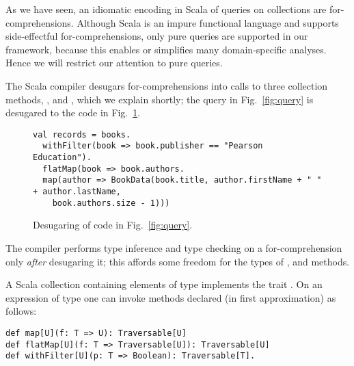 

As we have seen, an idiomatic encoding in Scala of queries on collections are for-comprehensions. Although Scala is an impure functional language and supports side-effectful for-comprehensions, only pure queries are supported in our framework, because this enables or simplifies many domain-specific analyses. Hence we will restrict our attention to pure queries.

The Scala compiler desugars for-comprehensions into calls to three collection methods, ,  and , which we explain shortly; the query in Fig.~\ref{fig:query} is desugared to the code in Fig.~\ref{fig:desugaredQuery}.
\begin{figure}
\begin{center}
\begin{lstlisting}
val records = books.
  withFilter(book => book.publisher == "Pearson Education").
  flatMap(book => book.authors.
  map(author => BookData(book.title, author.firstName + " " + author.lastName,
    book.authors.size - 1)))
\end{lstlisting}
\end{center}
\caption{Desugaring of code in Fig.~\ref{fig:query}.}
\label{fig:desugaredQuery}
\end{figure}

The compiler performs type inference and type checking on a for-comprehension only \emph{after} desugaring it; this affords some freedom for the types of ,  and  methods.

A Scala collection containing elements of type  implements the trait .
On an expression  of type  one can invoke methods declared (in first approximation) as follows:
\begin{lstlisting}
def map[U](f: T => U): Traversable[U]
def flatMap[U](f: T => Traversable[U]): Traversable[U]
def withFilter[U](p: T => Boolean): Traversable[T].
\end{lstlisting}

